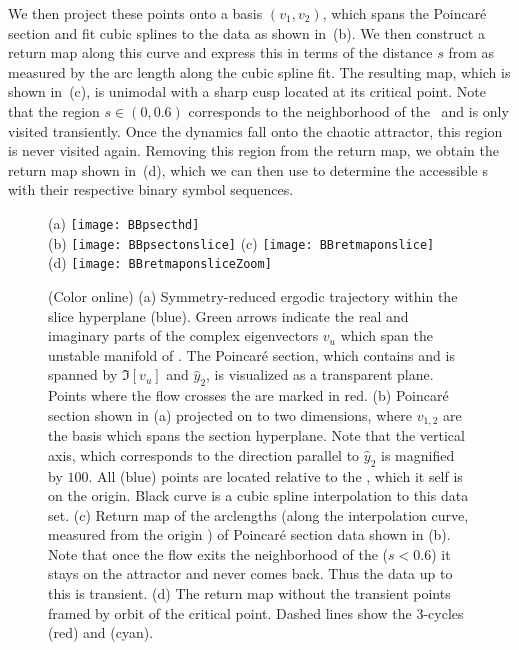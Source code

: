 \documentclass[aip,cha,
reprint,
secnumarabic,
nofootinbib, tightenlines,
nobibnotes, showkeys, showpacs,
superscriptaddress,
]{revtex4-1}
\begin{document}
We then project these points onto a basis $(v_1, v_2)$, which spans the 
Poincar\'e section and fit cubic splines to the data as shown in 
\,(b). We then construct a return map along this 
curve and express this in terms of the distance $s$ from \REQV{}{} as 
measured by the arc length along the cubic spline fit. The resulting map, 
which is shown in \,(c), is unimodal with a sharp 
cusp located at its critical point. Note that the region $s \in (0, 0.6)$ 
corresponds to the neighborhood of the \reqv\  and is only visited 
transiently. Once the dynamics fall onto the chaotic attractor, this region is 
never visited again. Removing this region from the return map, we obtain the 
return map shown in \,(d), which we can then use to 
determine the accessible \rpo s  with their respective binary symbol 
sequences.

\begin{figure}
\centering
  (a) \texttt{[image: BBpsecthd]} \\
  (b) \texttt{[image: BBpsectonslice]}
  (c) \texttt{[image: BBretmaponslice]} \\
  (d) \texttt{[image: BBretmaponsliceZoom]}
\caption{(Color online)
         (a) Symmetry-reduced ergodic trajectory within the slice hyperplane 
             (blue). Green arrows indicate the real and imaginary parts of the 
             complex eigenvectors $v_u$ which span the unstable manifold of 
             \REQV{}{}. The Poincar\'e section, which contains \REQV{}{} and 
             is spanned by $\Im[v_u]$ and $\hat{y}_2$, is visualized as a 
             transparent plane. Points where the flow crosses the are marked 
             in red.
		 (b) Poincar\'e section shown in (a) projected on to two dimensions, 
		 	 where $v_{1,2}$ are the basis which spans the section hyperplane.
		 	 Note that the vertical axis, which corresponds to the direction 
		 	 parallel to $\hat{y}_2$ is magnified by $100$. All (blue) points 
		 	 are located relative to the \REQV{}{}, which it self is on the origin.
		 	 Black curve is a cubic spline interpolation to this data set.		  	
		 (c) Return map of the arclengths (along the interpolation curve, measured
		     from the origin \REQV{}{}) of Poincar\'e section data shown in (b). 
			 Note that once the flow exits the neighborhood of the \REQV{}{} 
			 ($s < 0.6$) it stays on the attractor and never comes back. Thus the data 
			 up to this is transient.
		 (d) The return map without the transient points framed by orbit of the 
		     critical point. Dashed lines show the 3-cycles  (red) and 
		      (cyan).}
\label{fig:psectandretmap}
\end{figure}
\end{document}
